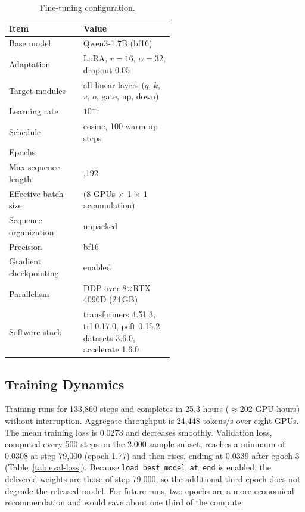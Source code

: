 \documentclass[10pt,twocolumn,letterpaper]{article}
\begin{document}
\begin{table}[t]
\centering
\small
\setlength{\tabcolsep}{3pt}
\begin{tabular}{@{}l>{\raggedright\arraybackslash}p{0.55\linewidth}@{}}
\toprule
Item & Value \\
\midrule
Base model & Qwen3-1.7B (bf16) \\
Adaptation & LoRA, $r=16$, $\alpha=32$, dropout $0.05$ \\
Target modules & all linear layers ($q$, $k$, $v$, $o$, gate, up, down) \\
Learning rate & $10^{-4}$ \\
Schedule & cosine, 100 warm-up steps \\
Epochs & 3 \\
Max sequence length & 8,192 \\
Effective batch size & 8 (8 GPUs $\times$ 1 $\times$ 1 accumulation) \\
Sequence organization & unpacked \\
Precision & bf16 \\
Gradient checkpointing & enabled \\
Parallelism & DDP over 8$\times$RTX 4090D (24\,GB) \\
Software stack & transformers 4.51.3, trl 0.17.0, peft 0.15.2, datasets 3.6.0, accelerate 1.6.0 \\
\bottomrule
\end{tabular}
\caption{Fine-tuning configuration.}
\label{tab:finetune-config}
\end{table}

\subsection{Training Dynamics}
Training runs for 133,860 steps and completes in 25.3 hours ($\approx$202 GPU-hours) without interruption. Aggregate throughput is 24,448 tokens/s over eight GPUs. The mean training loss is 0.0273 and decreases smoothly. Validation loss, computed every 500 steps on the 2,000-sample subset, reaches a minimum of 0.0308 at step 79,000 (epoch 1.77) and then rises, ending at 0.0339 after epoch 3 (Table~\ref{tab:eval-loss}). Because \texttt{load\_best\_model\_at\_end} is enabled, the delivered weights are those of step 79,000, so the additional third epoch does not degrade the released model. For future runs, two epochs are a more economical recommendation and would save about one third of the compute.
\end{document}
